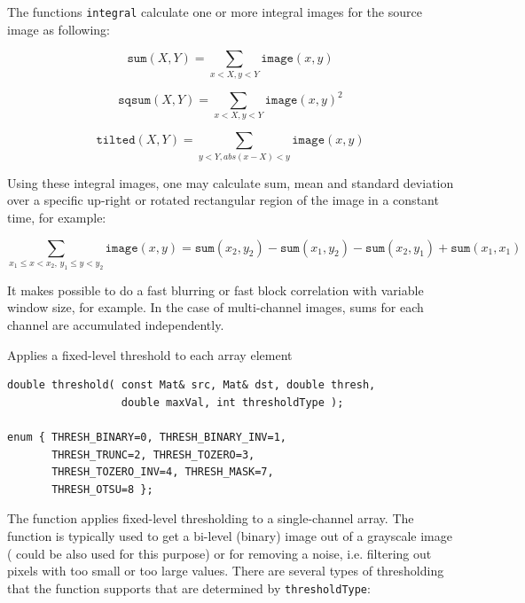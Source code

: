 The functions \texttt{integral} calculate one or more integral images for the source image as following:

\[
\texttt{sum}(X,Y) = \sum_{x<X,y<Y} \texttt{image}(x,y)
\]

\[
\texttt{sqsum}(X,Y) = \sum_{x<X,y<Y} \texttt{image}(x,y)^2
\]

\[
\texttt{tilted}(X,Y) = \sum_{y<Y,abs(x-X)<y} \texttt{image}(x,y)
\]

Using these integral images, one may calculate sum, mean and standard deviation over a specific up-right or rotated rectangular region of the image in a constant time, for example:

\[
\sum_{x_1\leq x < x_2, \, y_1 \leq y < y_2} \texttt{image}(x,y) = \texttt{sum}(x_2,y_2)-\texttt{sum}(x_1,y_2)-\texttt{sum}(x_2,y_1)+\texttt{sum}(x_1,x_1)
\]

It makes possible to do a fast blurring or fast block correlation with variable window size, for example. In the case of multi-channel images, sums for each channel are accumulated independently.


\label{threshold}
Applies a fixed-level threshold to each array element

\begin{lstlisting}
double threshold( const Mat& src, Mat& dst, double thresh,
                  double maxVal, int thresholdType );

enum { THRESH_BINARY=0, THRESH_BINARY_INV=1,
       THRESH_TRUNC=2, THRESH_TOZERO=3,
       THRESH_TOZERO_INV=4, THRESH_MASK=7,
       THRESH_OTSU=8 };
\end{lstlisting}
\begin{description}
\end{description}

The function applies fixed-level thresholding
to a single-channel array. The function is typically used to get a
bi-level (binary) image out of a grayscale image ( could
be also used for this purpose) or for removing a noise, i.e. filtering
out pixels with too small or too large values. There are several
types of thresholding that the function supports that are determined by
\texttt{thresholdType}:

